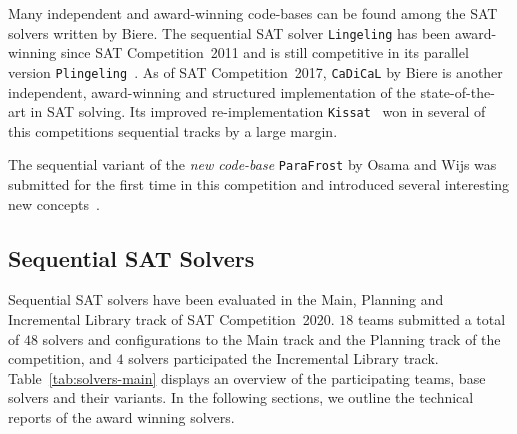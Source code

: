 \documentclass{elsarticle}
\newcommand{\solver}[1]{\texttt{#1}}
\begin{document}
Many independent and award-winning code-bases can be found among the SAT solvers written by Biere. 
The sequential SAT solver \solver{Lingeling} has been award-winning since SAT Competition~2011 and is still competitive in its parallel version \solver{Plingeling}~\cite{Biere:2012:Lingeling}. 
As of SAT Competition~2017, \solver{CaDiCaL} %
by Biere is another independent, award-winning and structured implementation of the state-of-the-art in SAT solving. 
Its improved re-implementation \solver{Kissat}~\cite{Biere:SC2020} won in several of this competitions sequential tracks by a large margin. 

The sequential variant of the \emph{new code-base} \solver{ParaFrost} by Osama and Wijs was submitted for the first time in this competition and introduced several interesting new concepts~\cite{Osama:SC2020:Parafrost}. 


\subsection{Sequential SAT Solvers}
\label{sec:part:seq}

Sequential SAT solvers have been evaluated in the Main, Planning and Incremental Library track of SAT Competition~2020. 
$18$ teams submitted a total of $48$ solvers and configurations to the Main track and the Planning track of the competition, and $4$ solvers participated the Incremental Library track. 
%
Table~\ref{tab:solvers-main} displays an overview of the participating teams, base solvers and their variants. 
In the following sections, we outline the technical reports of the award winning solvers. 
\end{document}
